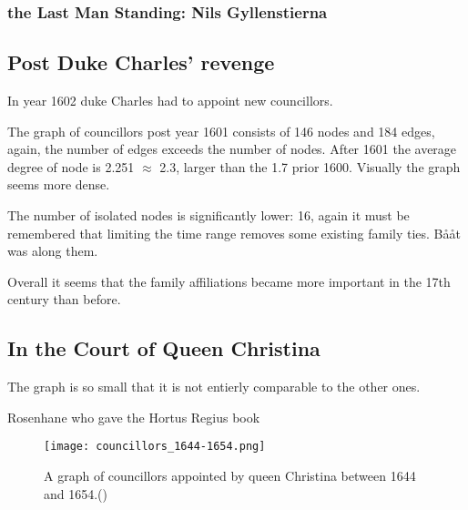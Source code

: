 \subsubsection{the Last Man Standing: Nils Gyllenstierna}
\subsection{Post Duke Charles' revenge}
In year 1602 duke Charles had to appoint new councillors.

The graph of councillors post year 1601 consists of 146 nodes and 184 edges, again, the number of edges exceeds the number of nodes. After 1601 the average degree of node is 2.251 $\approx$ 2.3, larger than the 1.7 prior 1600. Visually the graph seems more dense. 

The number of isolated nodes is significantly lower: 16, again it must be remembered that limiting the time range removes some existing family ties. Bååt was along them.

Overall it seems that the family affiliations became more important in the 17th century than before.

\subsection{In the Court of Queen Christina}
The graph is so small that it is not entierly comparable to the other ones.

Rosenhane who gave the Hortus Regius book
\begin{figure}
	\texttt{[image: councillors\_1644-1654.png]}
	\caption[Councillors appointed by queen Christina]{A graph of councillors appointed by queen Christina between 1644 and 1654.(\cite{councillorsDS})} 
	\centering
\end{figure}

\label{christina}